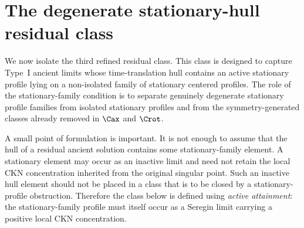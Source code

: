 %
%
%

\section{The degenerate stationary-hull residual class}
\label{sec:R3-degenerate-stationary-hull}

We now isolate the third refined residual class.  This class is designed to
capture Type~I ancient limits whose time-translation hull contains an active
stationary profile lying on a non-isolated family of stationary centered
profiles.  The role of the stationary-family condition is to separate genuinely degenerate
stationary profile families from isolated stationary profiles and from the
symmetry-generated classes already removed in \(\Cax\) and \(\Crot\).

A small point of formulation is important.  It is not enough to assume that the
hull of a residual ancient solution contains some stationary-family element.  A
stationary element may occur as an inactive limit and need not retain the local
CKN concentration inherited from the original singular point.  Such an inactive
hull element should not be placed in a class that is to be closed by a
stationary-profile obstruction.  Therefore the class below is defined using
\emph{active attainment}: the stationary-family profile must itself occur as a
Seregin limit carrying a positive local CKN concentration.

